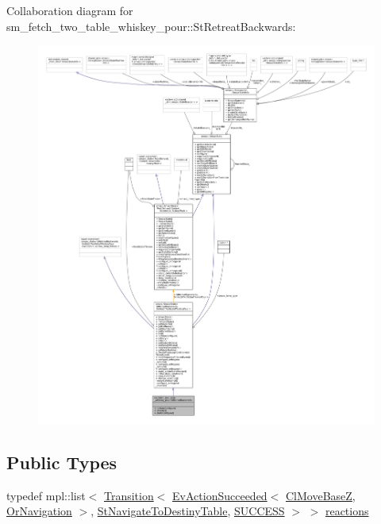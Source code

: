 Collaboration diagram for sm\+\_\+fetch\+\_\+two\+\_\+table\+\_\+whiskey\+\_\+pour\+:\+:St\+Retreat\+Backwards\+:
\nopagebreak
\begin{figure}[H]
\begin{center}
\leavevmode
\includegraphics[width=350pt]{structsm__fetch__two__table__whiskey__pour_1_1StRetreatBackwards__coll__graph}
\end{center}
\end{figure}
\subsection*{Public Types}
\begin{DoxyCompactItemize}
\item 
typedef mpl\+::list$<$ \hyperlink{classsmacc_1_1Transition}{Transition}$<$ \hyperlink{structsmacc_1_1default__events_1_1EvActionSucceeded}{Ev\+Action\+Succeeded}$<$ \hyperlink{classcl__move__base__z_1_1ClMoveBaseZ}{Cl\+Move\+BaseZ}, \hyperlink{classsm__fetch__two__table__whiskey__pour_1_1OrNavigation}{Or\+Navigation} $>$, \hyperlink{structsm__fetch__two__table__whiskey__pour_1_1StNavigateToDestinyTable}{St\+Navigate\+To\+Destiny\+Table}, \hyperlink{structsmacc_1_1default__transition__tags_1_1SUCCESS}{S\+U\+C\+C\+E\+SS} $>$ $>$ \hyperlink{structsm__fetch__two__table__whiskey__pour_1_1StRetreatBackwards_a1d5438e8b1bfc946206480a52b790238}{reactions}
\end{DoxyCompactItemize}
